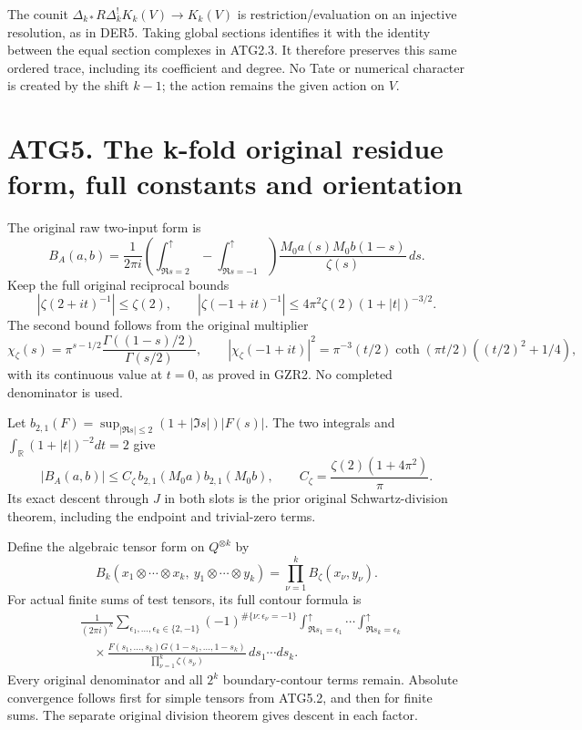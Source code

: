 The counit \(\Delta_{k*}R\Delta_k^!K_k(V)\to K_k(V)\) is
restriction/evaluation on an injective resolution, as in DER5. Taking
global sections identifies it with the identity between the equal
section complexes in ATG2.3. It therefore preserves this same ordered
trace, including its coefficient and degree. No Tate or numerical
character is created by the shift \(k-1\); the action remains the given
action on \(V\).

\section{ATG5. The k-fold original residue form, full constants and
orientation}\label{atg5.-the-k-fold-original-residue-form-full-constants-and-orientation}

The original raw two-input form is \[
B_A(a,b)=\frac1{2\pi i}
\left(\int_{\Re s=2}^{\uparrow}-\int_{\Re s=-1}^{\uparrow}\right)
\frac{M_0a(s)M_0b(1-s)}{\zeta(s)}\,ds.
\] Keep the full original reciprocal bounds \[
|\zeta(2+it)^{-1}|\le\zeta(2),\qquad
|\zeta(-1+it)^{-1}|\le
4\pi^2\zeta(2)(1+|t|)^{-3/2}.
\tag{ATG5.1}
\] The second bound follows from the original multiplier \[
\chi_\zeta(s)=\pi^{s-1/2}\frac{\Gamma((1-s)/2)}{\Gamma(s/2)},\qquad
|\chi_\zeta(-1+it)|^2=
\pi^{-3}(t/2)\coth(\pi t/2)((t/2)^2+1/4),
\] with its continuous value at \(t=0\), as proved in GZR2. No completed
denominator is used.

Let \(b_{2,1}(F)=\sup_{|\Re s|\le2}(1+|\Im s|)|F(s)|\). The two
integrals and \(\int_{\mathbb R}(1+|t|)^{-2}dt=2\) give \[
|B_A(a,b)|\le C_\zeta\,b_{2,1}(M_0a)b_{2,1}(M_0b),
\qquad C_\zeta=\frac{\zeta(2)(1+4\pi^2)}{\pi}.
\tag{ATG5.2}
\] Its exact descent through \(J\) in both slots is the prior original
Schwartz-division theorem, including the endpoint and trivial-zero
terms.

Define the algebraic tensor form on \(Q^{\otimes k}\) by \[
B_k(x_1\otimes\cdots\otimes x_k,\ y_1\otimes\cdots\otimes y_k)
=\prod_{\nu=1}^k B_\zeta(x_\nu,y_\nu).
\tag{ATG5.3}
\] For actual finite sums of test tensors, its full contour formula is
\[
\begin{aligned}
&\frac1{(2\pi i)^k}
\sum_{\epsilon_1,\ldots,\epsilon_k\in\{2,-1\}}
(-1)^{\#\{\nu:\epsilon_\nu=-1\}}
\int_{\Re s_1=\epsilon_1}^{\uparrow}\cdots
\int_{\Re s_k=\epsilon_k}^{\uparrow}
\\&\quad{}\times \frac{F(s_1,\ldots,s_k)G(1-s_1,\ldots,1-s_k)}
{\prod_{\nu=1}^k\zeta(s_\nu)}\,ds_1\cdots ds_k.
\end{aligned}
\tag{ATG5.4}
\] Every original denominator and all \(2^k\) boundary-contour terms
remain. Absolute convergence follows first for simple tensors from
ATG5.2, and then for finite sums. The separate original division theorem
gives descent in each factor.

